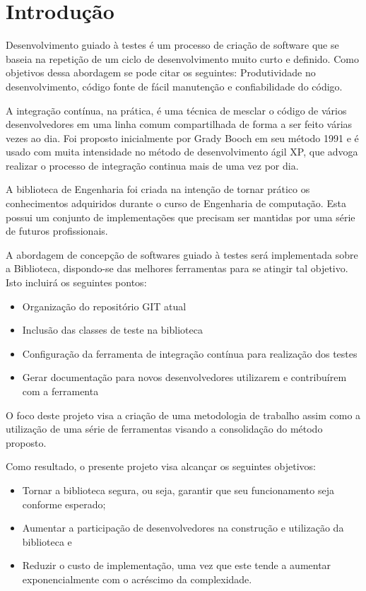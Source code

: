 \documentclass[
	article,			%
	12pt,				%
	oneside,			%
	a4paper,			%
	english,			
	brazil,
	sumario=tradicional
	]{abntex2}
\begin{document}
\textual

\section*{Introdução}

Desenvolvimento guiado à testes é um processo de criação de software
que se baseia na repetição de um ciclo de desenvolvimento muito curto e definido.
Como objetivos dessa abordagem se pode citar os seguintes: Produtividade no desenvolvimento,
código fonte de fácil manutenção e confiabilidade do código.

A integração contínua, na prática, é uma técnica de mesclar o código de vários desenvolvedores em uma linha comum compartilhada de forma a ser feito várias vezes ao dia. Foi proposto inicialmente por Grady Booch em seu método 1991 e é usado com muita intensidade no método de desenvolvimento ágil XP, que advoga realizar o processo de integração continua mais de uma vez por dia.

A biblioteca de Engenharia foi criada na intenção de tornar prático os conhecimentos adquiridos durante o curso de Engenharia de computação. Esta possui um conjunto de implementações que precisam ser mantidas por uma série de futuros profissionais.

A abordagem de concepção de softwares guiado à testes será implementada sobre a Biblioteca, dispondo-se das melhores ferramentas para se atingir tal objetivo. Isto incluirá os seguintes pontos:

\begin{itemize}
	\item{Organização do repositório GIT atual}
	\item{Inclusão das classes de teste na biblioteca}
	\item{Configuração da ferramenta de integração contínua para realização dos testes}
	\item{Gerar documentação para novos desenvolvedores utilizarem e contribuírem com a ferramenta}
\end{itemize}

O foco deste projeto visa a criação de uma metodologia de trabalho assim como a utilização de uma série de ferramentas visando a consolidação do método proposto.

Como resultado, o presente projeto visa alcançar os seguintes objetivos:
\begin{itemize}
	\item{Tornar a biblioteca segura, ou seja, garantir que seu funcionamento seja conforme esperado;}
	\item{Aumentar a participação de desenvolvedores na construção e utilização da biblioteca e}
	\item{Reduzir o custo de implementação, uma vez que este tende a aumentar exponencialmente com o acréscimo da complexidade.}
\end{itemize}
\end{document}
